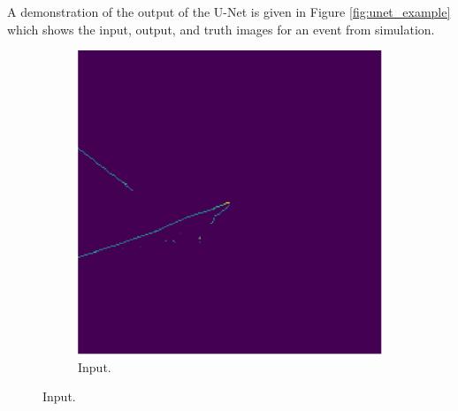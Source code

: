 A demonstration of the output of the U-Net is given in Figure 
\ref{fig:unet_example} which shows the input, output, and truth images for an 
event from \protodune{} simulation.
\begin{figure}
	\centering

	\begin{subfigure}[b]{0.5\textwidth}
		\centering
		\includegraphics[width=\textwidth]{figures/unet_example_in.pdf}
		\caption {Input.}
		\label{fig:unet_example_in}
	\end{subfigure}


\end{figure}
